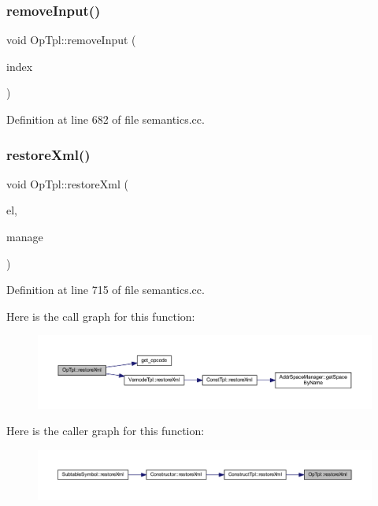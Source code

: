 \subsubsection{\texorpdfstring{removeInput()}{removeInput()}}
{\footnotesize\ttfamily void Op\+Tpl\+::remove\+Input (\begin{DoxyParamCaption}\item[{int4}]{index }\end{DoxyParamCaption})}



Definition at line 682 of file semantics.\+cc.

\mbox{\label{class_op_tpl_a538b7121bcb439945a4f0b8b1f03f3a2}} 
\subsubsection{\texorpdfstring{restoreXml()}{restoreXml()}}
{\footnotesize\ttfamily void Op\+Tpl\+::restore\+Xml (\begin{DoxyParamCaption}\item[{const \mbox{\hyperlink{class_element}{Element}} $\ast$}]{el,  }\item[{const \mbox{\hyperlink{class_addr_space_manager}{Addr\+Space\+Manager}} $\ast$}]{manage }\end{DoxyParamCaption})}



Definition at line 715 of file semantics.\+cc.

Here is the call graph for this function\+:
\nopagebreak
\begin{figure}[H]
\begin{center}
\leavevmode
\includegraphics[width=350pt]{class_op_tpl_a538b7121bcb439945a4f0b8b1f03f3a2_cgraph}
\end{center}
\end{figure}
Here is the caller graph for this function\+:
\nopagebreak
\begin{figure}[H]
\begin{center}
\leavevmode
\includegraphics[width=350pt]{class_op_tpl_a538b7121bcb439945a4f0b8b1f03f3a2_icgraph}
\end{center}
\end{figure}
\mbox{\label{class_op_tpl_aa35283135fb5864ff5b493d8d8886401}} 
